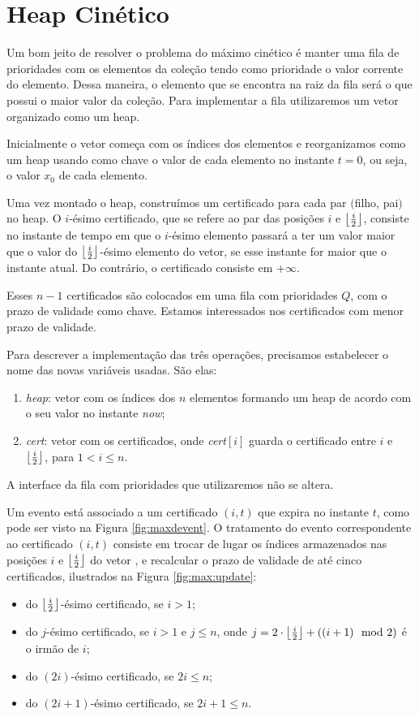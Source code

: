 
\section{Heap Cinético}
\label{heap:secao}
Um bom jeito de resolver o problema do máximo cinético é manter uma
fila de prioridades com os elementos da coleção tendo como
prioridade o valor corrente do elemento. Dessa maneira, o elemento
que se encontra na raiz da fila será o que possui o maior valor da
coleção. Para implementar a fila utilizaremos um vetor organizado
como um heap.

Inicialmente o vetor começa com os índices dos elementos e
reorganizamos como um heap usando como chave o valor de cada
elemento no instante $t = 0$, ou seja, o valor $x_0$ de cada
elemento.

Uma vez montado o heap, construímos um certificado para cada par
$($filho, pai$)$ no heap. O $i$-ésimo certificado, que se refere ao
par das posições $i$ e $\left\lfloor \frac{i}{2} \right\rfloor$, consiste no instante
de tempo em que o $i$-ésimo elemento passará a ter um valor maior
que o valor do $\left\lfloor \frac{i}{2} \right\rfloor$-ésimo elemento do vetor, se
esse instante for maior que o instante atual. Do contrário, o
certificado consiste em $+\infty$.

Esses $n - 1$ certificados são colocados em uma fila com prioridades
$Q$, com o prazo de validade como chave. Estamos interessados nos
certificados com menor prazo de validade.

Para descrever a implementação das três operações, precisamos
estabelecer o nome das novas variáveis usadas. São elas:
\begin{enumerate}
    \item \textit{heap}: vetor com os índices dos $n$ elementos
    formando um heap de acordo com o seu valor no instante
    \textit{now};
    \item \textit{cert}: vetor com os certificados, onde
    \textit{cert}$[i]$ guarda o certificado entre $i$ e
    $\left\lfloor \frac{i}{2} \right\rfloor$, para $1 < i \leq n$.
\end{enumerate}

A interface da fila com prioridades que utilizaremos não se altera.

Um evento está associado a um certificado $(i, t)$ que expira no
instante $t$, como pode ser visto na Figura \ref{fig:maxdevent}. O
tratamento do evento correspondente ao certificado $(i, t)$ consiste
em trocar de lugar os índices armazenados nas posições $i$ e
$\left\lfloor \frac{i}{2} \right\rfloor$ do vetor \heap, e recalcular o prazo de
validade de até cinco certificados, ilustrados na Figura
\ref{fig:max:update}:
\begin{itemize}
    \item do $\left\lfloor \frac{i}{2} \right\rfloor$-ésimo certificado, se $i > 1$;
    \item do $j$-ésimo certificado, se $i > 1$ e $j \leq n$,
    onde $j = 2\cdot \left\lfloor \frac{i}{2} \right\rfloor + ((i + 1)\mod2)$
    é o irmão de $i$;
    \item do $(2i)$-ésimo certificado, se $2i \leq n$;
    \item do $(2i + 1)$-ésimo certificado, se $2i + 1 \leq n$.
\end{itemize}

